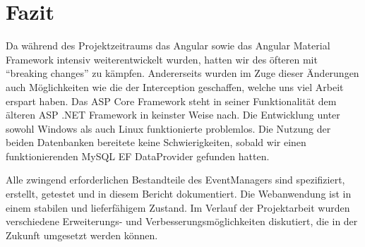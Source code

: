 
\chapter{Fazit}

Da während des Projektzeitraums das Angular sowie das Angular Material Framework intensiv weiterentwickelt wurden, hatten wir des öfteren mit \enquote{breaking changes} zu kämpfen. Andererseits wurden im Zuge dieser Änderungen auch Möglichkeiten wie die der Interception geschaffen, welche uns viel Arbeit erspart haben. Das ASP Core Framework steht in seiner Funktionalität dem älteren ASP .NET Framework in keinster Weise nach. Die Entwicklung unter sowohl Windows als auch Linux funktionierte problemlos. Die Nutzung der beiden Datenbanken bereitete keine Schwierigkeiten, sobald wir einen funktionierenden MySQL EF DataProvider gefunden hatten.

Alle zwingend erforderlichen Bestandteile des EventManagers sind spezifiziert, erstellt, getestet und in diesem Bericht dokumentiert. Die Webanwendung ist in einem stabilen und lieferfähigem Zustand. Im Verlauf der Projektarbeit wurden verschiedene Erweiterungs- und Verbesserungsmöglichkeiten diskutiert, die in der Zukunft umgesetzt werden können.
